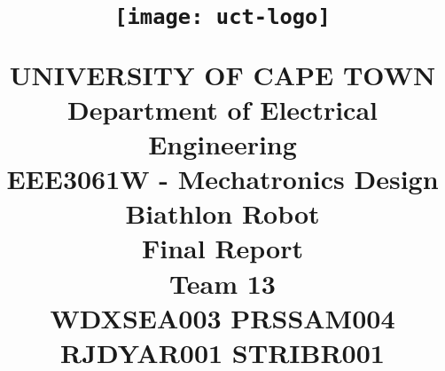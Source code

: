 
\newcommand{\reportTitle}{Final Report} %
\newcommand{\reportDueDate}{Wednesday,\ September\ 03,\ 2014}                    %
\newcommand{\reportClass}{EEE3061W - Mechatronics Design}                               %
\newcommand{\reportClassTime}{10:30am}                                 %
\newcommand{\reportClassInstructor}{Jones}                               %
\newcommand{\reportAuthorName}{Team 13}                           %
\newcommand{\reportDepartment}{Department of Electrical Engineering}           %


\title{
\begin{figure}[H]
  \begin{center}
    \texttt{[image: uct-logo]}
  \end{center}
\end{figure}
\textmd{\Huge UNIVERSITY OF CAPE TOWN \\ \LARGE \reportDepartment} \\
\vspace{2in}
\textmd{\textbf{\LARGE \reportClass \\ \Huge Biathlon Robot \\ \reportTitle \\ \vspace{1.5in} \Large Team 13 \\  WDXSEA003 \textbar\space PRSSAM004 \textbar\space RJDYAR001 \textbar\space STRIBR001}}\\
}

\date{}



  \maketitle
  \thispagestyle{empty}

